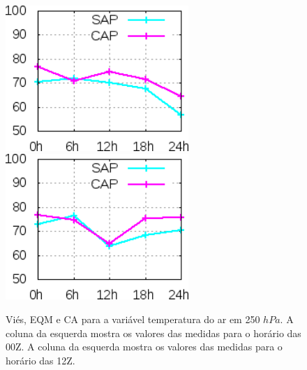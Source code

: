 \begin{figure}[!hbp]
\includegraphics[height=5.5cm]{./figs/CA250temp0Z.png}\includegraphics[height=5.5cm]{./figs/CA250temp12Z.png}
\caption{Viés, EQM e CA para a variável temperatura do ar em 250 $hPa$. A coluna da esquerda mostra os valores das medidas para o horário das 00Z. A coluna da esquerda mostra os valores das medidas para o horário das 12Z.}
\label{fig57}
\end{figure}
